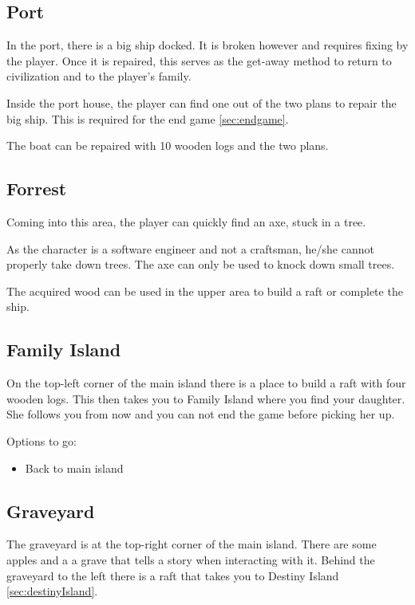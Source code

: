 \documentclass[a4paper]{scrreprt}
\begin{document}
\subsection{Port}
\label{sec:port}

In the port, there is a big ship docked. It is broken however and requires fixing by the player. Once it is repaired, this serves as the get-away method to return to civilization and to the player's family.

Inside the port house, the player can find one out of the two plans to repair the big ship. This is required for the end game \ref{sec:endgame}.

The boat can be repaired with 10 wooden logs and the two plans.

\subsection{Forrest}
\label{sec:forrest}

Coming into this area, the player can quickly find an axe, stuck in a tree.

As the character is a software engineer and not a craftsman, he/she cannot properly take down trees. The axe can only be used to knock down small trees.


The acquired wood can be used in the upper area to build a raft or complete the ship.

\subsection{Family Island}
\label{sec:familyIsland}
On the top-left corner of the main island there is a place to build a raft with four wooden logs. This then takes you to Family Island where you find your daughter. She follows you from now and you can not end the game before picking her up.

Options to go:
\begin{itemize}
    \item Back to main island
\end{itemize}

\subsection{Graveyard}
\label{sec:graveyard}
The graveyard is at the top-right corner of the main island. There are some apples and a a grave that tells a story when interacting with it.
Behind the graveyard to the left there is a raft that takes you to Destiny Island \ref{sec:destinyIsland}.
\end{document}
